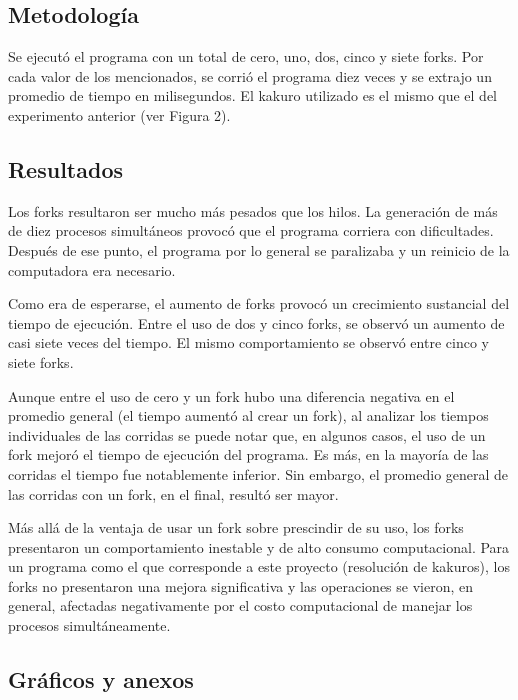 \documentclass[conference]{IEEEtran}
\begin{document}
\subsection*{Metodología}

    Se ejecutó el programa con un total de cero, uno, dos, cinco y siete forks. Por cada valor de los mencionados, se corrió el programa diez veces y se extrajo un promedio de tiempo en milisegundos. El kakuro utilizado es el mismo que el del experimento anterior (ver Figura 2).


\subsection*{Resultados}

    Los forks resultaron ser mucho más pesados que los hilos. La generación de más de diez procesos simultáneos provocó que el programa corriera con dificultades. Después de ese punto, el programa por lo general se paralizaba y un reinicio de la computadora era necesario.\newline
    
    Como era de esperarse, el aumento de forks provocó un crecimiento sustancial del tiempo de ejecución. Entre el uso de dos y cinco forks, se observó un aumento de casi siete veces del tiempo. El mismo comportamiento se observó entre cinco y siete forks.\newline
    
    Aunque entre el uso de cero y un fork hubo una diferencia negativa en el promedio general (el tiempo aumentó al crear un fork), al analizar los tiempos individuales de las corridas se puede notar que, en algunos casos, el uso de un fork mejoró el tiempo de ejecución del programa. Es más, en la mayoría de las corridas el tiempo fue notablemente inferior. Sin embargo, el promedio general de las corridas con un fork, en el final, resultó ser mayor.\newline
    
    Más allá de la ventaja de usar un fork sobre prescindir de su uso, los forks presentaron un comportamiento inestable y de alto consumo computacional. Para un programa como el que corresponde a este proyecto (resolución de kakuros), los forks no presentaron una mejora significativa y las operaciones se vieron, en general, afectadas negativamente por el costo computacional de manejar los procesos simultáneamente. \newline
    

\subsection*{Gráficos y anexos}
\end{document}
